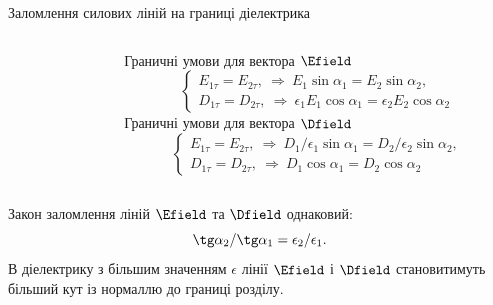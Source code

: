 \documentclass[]{beamer}
\begin{document}
\begin{frame}{Заломлення силових ліній на границі діелектрика}{}
\begin{columns}
\begin{column}{0.55\linewidth}
		\end{column}
		\begin{column}{0.45\linewidth}\scriptsize
			Граничні умови для вектора $\Efield$
			\begin{equation*}
				\begin{cases}
					E_{1\tau} = E_{2\tau},\ \Rightarrow\ E_1\sin\alpha_1 = E_2\sin\alpha_2, \\
					D_{1\tau} = D_{2\tau},\ \Rightarrow\ \epsilon_1E_1\cos\alpha_1 =
					\epsilon_2E_2\cos\alpha_2
				\end{cases}
			\end{equation*}
			Граничні умови для вектора $\Dfield$
			\begin{equation*}
				\begin{cases}
					E_{1\tau} = E_{2\tau},\ \Rightarrow\ D_1/\epsilon_1\sin\alpha_1 =
					D_2/\epsilon_2\sin\alpha_2, \\
					D_{1\tau} = D_{2\tau},\ \Rightarrow\ D_1\cos\alpha_1 =
					D_2\cos\alpha_2
				\end{cases}
			\end{equation*}
		\end{column}
	\end{columns}
	\begin{block}{}\justifying
		Закон заломлення ліній $\Efield$ та $\Dfield$ однаковий:
		\begin{equation*}
			\tg\alpha_2 / \tg\alpha_1 = \epsilon_2 / \epsilon_1.
		\end{equation*}
		В діелектрику з більшим значенням $\epsilon$ лінії $\Efield$ і $\Dfield$
		становитимуть більший кут із нормаллю до границі розділу.
	\end{block}
\end{frame}


%
\end{document}
